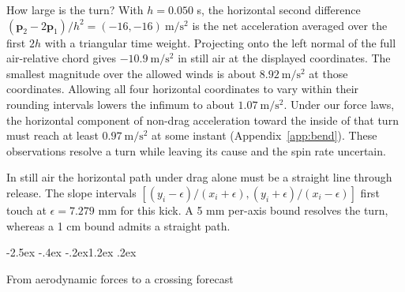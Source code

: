\documentclass[11pt,letterpaper]{article}
\makeatletter
\renewcommand{\section}{\reserveheadroom\@startsection{section}{1}{\z@}
  {-2.5ex \@plus -.4ex \@minus -.2ex}{1.2ex \@plus .2ex}
  {\normalfont\Large\bfseries\color{black}\raggedright}}
\newcommand{\vv}[1]{\boldsymbol{#1}}
\newcommand{\reserveheadroom}{\par\ifdim\dimexpr\pagegoal-\pagetotal\relax<5\baselineskip\newpage\fi}
\makeatother
\begin{document}
How large is the turn? With \(h=0.050\) s, the horizontal second difference \((\vv p_2-2\vv p_1)/h^2=(-16,-16)\ \mathrm{m/s^2}\) is the net acceleration averaged over the first \(2h\) with a triangular time weight. Projecting onto the left normal of the full air-relative chord gives \(-10.9\ \mathrm{m/s^2}\) in still air at the displayed coordinates. The smallest magnitude over the allowed winds is about \(8.92\ \mathrm{m/s^2}\) at those coordinates. Allowing all four horizontal coordinates to vary within their rounding intervals lowers the infimum to about \(1.07\ \mathrm{m/s^2}\). Under our force laws, the horizontal component of non-drag acceleration toward the inside of that turn must reach at least \(0.97\ \mathrm{m/s^2}\) at some instant (Appendix~\ref{app:bend}). These observations resolve a turn while leaving its cause and the spin rate uncertain.

In still air the horizontal path under drag alone must be a straight line through release. The slope intervals \([(y_i-\epsilon)/(x_i+\epsilon),(y_i+\epsilon)/(x_i-\epsilon)]\) first touch at \(\epsilon=7.279\) mm for this kick. A 5 mm per-axis bound resolves the turn, whereas a 1 cm bound admits a straight path.

\reserveheadroom
\section{From aerodynamic forces to a crossing forecast}
\label{sec:forecast}
\end{document}
